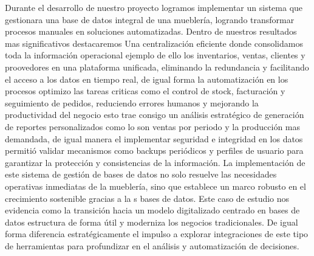 \documentclass[a4paper, 12pt]{article}
\begin{document}
Durante el desarrollo de nuestro proyecto logramos implementar un sistema que gestionara una base de datos integral de una mueblería, logrando transformar procesos manuales en soluciones automatizadas. Dentro de nuestros resultados mas significativos destacaremos 
\vspace{5mm}
Una centralización eficiente donde consolidamos toda la información operacional ejemplo de ello los inventarios, ventas, clientes y proovedores en una plataforma unificada, eliminando la redundancia y facilitando el acceso a los datos en tiempo real, de igual forma la automatización en los procesos optimizo las tareas criticas como el control de stock, facturación y seguimiento de pedidos, reduciendo errores humanos y mejorando la productividad del negocio esto trae consigo un análisis estratégico de generación de reportes personalizados como lo son ventas por periodo y la producción mas demandada, de igual manera el implementar seguridad e integridad en los datos permitió validar mecanismos como backups periódicos y perfiles de usuario para garantizar la protección y consistencias de la información.
\vspace{5mm}
La implementación de este sistema de gestión de bases de datos no solo resuelve las necesidades operativas inmediatas de la mueblería, sino que establece un marco robusto  en el crecimiento sostenible gracias a la s bases de datos.
Este caso de estudio nos evidencia como la transición hacia un modelo digitalizado centrado en bases de datos estructura de forma útil y moderniza los negocios tradicionales. De igual forma diferencia estratégicamente el impulso a explorar integraciones de este tipo de herramientas para profundizar en el análisis y automatización de decisiones.
\end{document}
